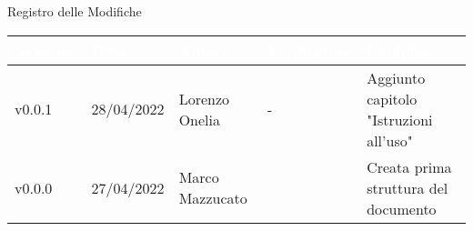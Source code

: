 \begin{center}
  \huge{Registro delle Modifiche}
\end{center}
\renewcommand\arraystretch{1,5}
{\centering
\begin{longtable}{|C{1.8cm}|C{2.1cm}|C{2cm}|C{2.4cm}|L{4.4cm}|}
  \hline
  \textcolor[HTML]{FFFFFF}{\textbf{Versione}} & \textcolor[HTML]{FFFFFF}{\textbf{Data}} & \textcolor[HTML]{FFFFFF}{\textbf{Autore}}  & \textcolor[HTML]{FFFFFF}{\textbf{Verificatore}} & \textcolor[HTML]{FFFFFF}{\textbf{Modifica}}    \\ \hline
  v0.0.1        & 28/04/2022    & Lorenzo Onelia    & -        & Aggiunto capitolo "Istruzioni all'uso" \\ \hline
  v0.0.0        & 27/04/2022    & Marco Mazzucato   &          & Creata prima struttura del documento \\ \hline
\end{longtable}}

\renewcommand\arraystretch{1}
